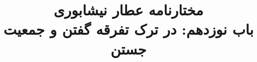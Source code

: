\documentclass[14pt,b5paper]{article}
\begin{document}
\title{\Huge مختارنامه عطار نیشابوری \\
باب نوزدهم: در ترک تفرقه گفتن و جمعیت جستن}
\author{ }
\date{ }
\maketitle
\newpage
\tableofcontents
\newpage

\newpage

\newpage

\newpage

\newpage

\newpage

\newpage

\newpage

\newpage

\newpage

\newpage

\newpage

\newpage

\newpage

\newpage

\newpage

\newpage

\newpage

\newpage

\newpage

\newpage

\newpage

\newpage

\newpage

\newpage

\newpage

\newpage

\newpage
\end{document}
